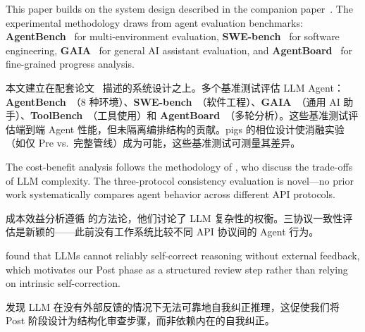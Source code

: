 This paper builds on the system design described in the companion paper~\citep{pigs_system_design}. The experimental methodology draws from agent evaluation benchmarks: \textbf{AgentBench}~\citep{liu2023agentbench} for multi-environment evaluation, \textbf{SWE-bench}~\citep{jimenez2024swebench} for software engineering, \textbf{GAIA}~\citep{mialon2023gaia} for general AI assistant evaluation, and \textbf{AgentBoard}~\citep{ma2024agentboard} for fine-grained progress analysis.
\begin{chinese}
本文建立在配套论文~\citep{pigs_system_design} 描述的系统设计之上。多个基准测试评估 LLM Agent：\textbf{AgentBench}~\citep{liu2023agentbench}（8 种环境）、\textbf{SWE-bench}~\citep{jimenez2024swebench}（软件工程）、\textbf{GAIA}~\citep{mialon2023gaia}（通用 AI 助手）、\textbf{ToolBench}~\citep{qin2023toolllm}（工具使用）和 \textbf{AgentBoard}~\citep{ma2024agentboard}（多轮分析）。这些基准测试评估端到端 Agent 性能，但未隔离编排结构的贡献。pigs 的相位设计使消融实验（如仅 Pre vs.\ 完整管线）成为可能，这些基准测试可测量其差异。
\end{chinese}

The cost-benefit analysis follows the methodology of \citet{kaddour2023challenges}, who discuss the trade-offs of LLM complexity. The three-protocol consistency evaluation is novel---no prior work systematically compares agent behavior across different API protocols.
\begin{chinese}
成本效益分析遵循 \citet{kaddour2023challenges} 的方法论，他们讨论了 LLM 复杂性的权衡。三协议一致性评估是新颖的——此前没有工作系统比较不同 API 协议间的 Agent 行为。
\end{chinese}

\citet{huang2024selfcorrect} found that LLMs cannot reliably self-correct reasoning without external feedback, which motivates our Post phase as a structured review step rather than relying on intrinsic self-correction.
\begin{chinese}
\citet{huang2024selfcorrect} 发现 LLM 在没有外部反馈的情况下无法可靠地自我纠正推理，这促使我们将 Post 阶段设计为结构化审查步骤，而非依赖内在的自我纠正。
\end{chinese}
